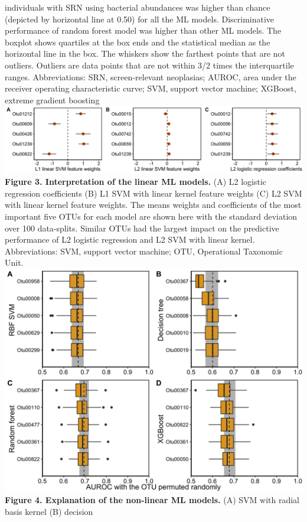 \documentclass[11pt,]{article}
\begin{document}
individuals with SRN using bacterial abundances was higher than chance
(depicted by horizontal line at 0.50) for all the ML models.
Discriminative performance of random forest model was higher than other
ML models. The boxplot shows quartiles at the box ends and the
statistical median as the horizontal line in the box. The whiskers show
the farthest points that are not outliers. Outliers are data points that
are not within 3/2 times the interquartile ranges. Abbreviations: SRN,
screen-relevant neoplasias; AUROC, area under the receiver operating
characteristic curve; SVM, support vector machine; XGBoost, extreme
gradient boosting \newpage
\includegraphics{Figure_3.png} \textbf{Figure 3. Interpretation of the
linear ML models.} (A) L2 logistic regression coefficients (B) L1 SVM
with linear kernel feature weights (C) L2 SVM with linear kernel feature
weights. The means weights and coefficients of the most important five
OTUs for each model are shown here with the standard deviation over 100
data-splits. Similar OTUs had the largest impact on the predictive
performance of L2 logistic regression and L2 SVM with linear kernel.
Abbreviations: SVM, support vector machine; OTU, Operational Taxonomic
Unit. \newpage
\includegraphics{Figure_4.png} \textbf{Figure 4. Explanation of the
non-linear ML models.} (A) SVM with radial basis kernel (B) decision
\end{document}
